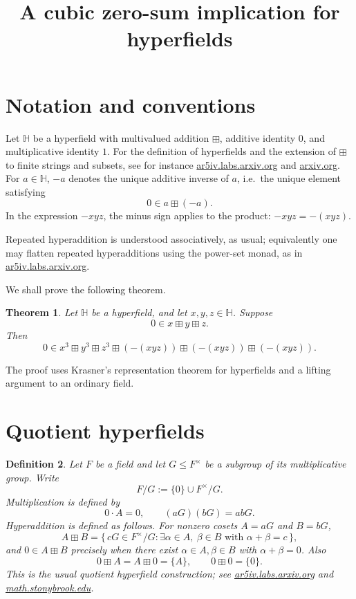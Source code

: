 \documentclass{article}
\title{A cubic zero-sum implication for hyperfields}
\author{}
\date{}
\newtheorem{theorem}{Theorem}
\newtheorem{definition}[theorem]{Definition}
\begin{document}
\maketitle

\section*{Notation and conventions}

Let \(\mathbb H\) be a hyperfield with multivalued addition \(\boxplus\), additive identity \(0\), and multiplicative identity \(1\). For the definition of hyperfields and the extension of \(\boxplus\) to finite strings and subsets, see for instance
\href{https://ar5iv.labs.arxiv.org/html/2307.09400}{ar5iv.labs.arxiv.org}
and
\href{https://arxiv.org/html/2309.17302}{arxiv.org}.
For \(a\in\mathbb H\), \(-a\) denotes the unique additive inverse of \(a\), i.e.\ the unique element satisfying
\[
0\in a\boxplus(-a).
\]
In the expression \(-xyz\), the minus sign applies to the product: \(-xyz=-(xyz)\).

Repeated hyperaddition is understood associatively, as usual; equivalently one may flatten repeated hyperadditions using the power-set monad, as in
\href{https://ar5iv.labs.arxiv.org/html/2307.09400}{ar5iv.labs.arxiv.org}.

We shall prove the following theorem.

\begin{theorem}\label{thm:main}
Let \(\mathbb H\) be a hyperfield, and let \(x,y,z\in\mathbb H\). Suppose
\[
0\in x\boxplus y\boxplus z.
\]
Then
\[
0\in x^3\boxplus y^3\boxplus z^3\boxplus(-(xyz))\boxplus(-(xyz))\boxplus(-(xyz)).
\]
\end{theorem}

The proof uses Krasner's representation theorem for hyperfields and a lifting argument to an ordinary field.

\section{Quotient hyperfields}

\begin{definition}\label{def:quotient-hyperfield}
Let \(F\) be a field and let \(G\le F^\times\) be a subgroup of its multiplicative group. Write
\[
F/G:=\{0\}\cup F^\times/G.
\]
Multiplication is defined by
\[
0\cdot A=0,\qquad (aG)(bG)=abG.
\]
Hyperaddition is defined as follows. For nonzero cosets \(A=aG\) and \(B=bG\),
\[
A\boxplus B
=
\{\,cG\in F^\times/G : \exists \alpha\in A,\ \beta\in B\text{ with }\alpha+\beta=c\,\},
\]
and \(0\in A\boxplus B\) precisely when there exist \(\alpha\in A,\beta\in B\) with \(\alpha+\beta=0\). Also
\[
0\boxplus A=A\boxplus 0=\{A\},\qquad 0\boxplus 0=\{0\}.
\]
This is the usual quotient hyperfield construction; see
\href{https://ar5iv.labs.arxiv.org/html/1006.3034}{ar5iv.labs.arxiv.org}
and
\href{https://www.math.stonybrook.edu/\%7Eoleg/VersoTeX/Show/Hyperfields/hf.html}{math.stonybrook.edu}.
\end{definition}
\end{document}
